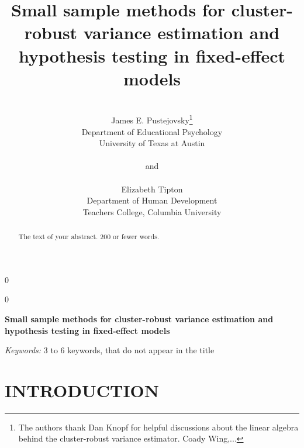 \documentclass[12pt]{article}\usepackage[]{graphicx}\usepackage[]{color}
\newcommand{\blind}{0}
\begin{document}
\def\spacingset#1{\renewcommand{\baselinestretch}%
{#1}\small\normalsize} \spacingset{1}



\blind
{
  \title{\bf Small sample methods for cluster-robust variance estimation and hypothesis testing in fixed-effect models}
  \author{\\James E. Pustejovsky\thanks{
    The authors thank Dan Knopf for helpful discussions about the linear algebra behind the cluster-robust variance estimator. Coady Wing,...}\hspace{.2cm}\\
    Department of Educational Psychology \\ 
    University of Texas at Austin\\ \\
    and \\ \\
    Elizabeth Tipton \\
    Department of Human Development \\ 
    Teachers College, Columbia University}
  \maketitle
} \fi

\blind
{
  \bigskip
  \bigskip
  \bigskip
  \begin{center}
    {\LARGE\bf Small sample methods for cluster-robust variance estimation and hypothesis testing in fixed-effect models}
\end{center}
  \medskip
} \fi

\bigskip
\begin{abstract}
The text of your abstract.  200 or fewer words.
\end{abstract}

\noindent%
{\it Keywords:}  3 to 6 keywords, that do not appear in the title
\vfill

\newpage
\spacingset{1.45} %

\section{INTRODUCTION}
\label{sec:intro}
\end{document}
